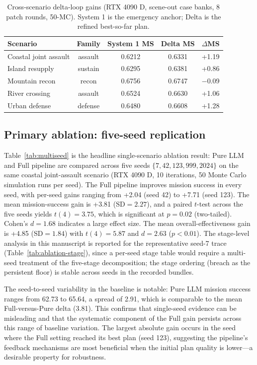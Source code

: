 \begin{table}[ht]
\centering
\caption{Cross-scenario delta-loop gains (RTX 4090 D, scene-out case banks, 8 patch rounds, 50-MC). System 1 is the emergency anchor; Delta is the refined best-so-far plan.}
\label{tab:delta-generalization}
\small
\setlength{\tabcolsep}{4pt}
\begin{tabular}{lcccc}
\toprule
Scenario & Family & System 1 MS & Delta MS & $\Delta$MS \\
\midrule
Coastal joint assault & assault & 0.6212 & 0.6331 & +1.19 \\
Island resupply & sustain & 0.6295 & 0.6381 & +0.86 \\
Mountain recon & recon & 0.6756 & 0.6747 & $-$0.09 \\
River crossing & assault & 0.6524 & 0.6630 & +1.06 \\
Urban defense & defense & 0.6480 & 0.6608 & +1.28 \\
\bottomrule
\end{tabular}
\end{table}

\subsection{Primary ablation: five-seed replication}

Table~\ref{tab:multiseed} is the headline single-scenario ablation result: Pure LLM and Full pipeline are compared across five seeds $\{7, 42, 123, 999, 2024\}$ on the same coastal joint-assault scenario (RTX 4090 D, 10 iterations, 50 Monte Carlo simulation runs per seed). The Full pipeline improves mission success in every seed, with per-seed gains ranging from +2.04 (seed 42) to +7.71 (seed 123). The mean mission-success gain is +3.81 ($\text{SD}=2.27$), and a paired $t$-test across the five seeds yields $t(4)=3.75$, which is significant at $p=0.02$ (two-tailed). Cohen's $d=1.68$ indicates a large effect size. The mean overall-effectiveness gain is +4.85 ($\text{SD}=1.84$) with $t(4)=5.87$ and $d=2.63$ ($p<0.01$). The stage-level analysis in this manuscript is reported for the representative seed-7 trace (Table~\ref{tab:ablation-stage}), since a per-seed stage table would require a multi-seed treatment of the five-stage decomposition; the stage ordering (breach as the persistent floor) is stable across seeds in the recorded bundles.

The seed-to-seed variability in the baseline is notable: Pure LLM mission success ranges from 62.73 to 65.64, a spread of 2.91, which is comparable to the mean Full-versus-Pure delta (3.81). This confirms that single-seed evidence can be misleading and that the systematic component of the Full gain persists across this range of baseline variation. The largest absolute gain occurs in the seed where the Full setting reached its best plan (seed 123), suggesting the pipeline's feedback mechanisms are most beneficial when the initial plan quality is lower---a desirable property for robustness.

